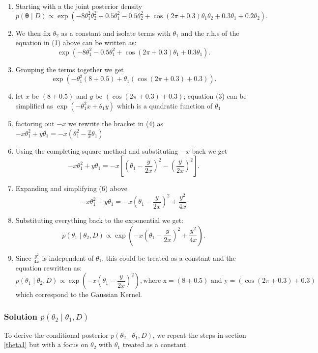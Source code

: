\documentclass[12pt]{article}
\begin{document}
\begin{enumerate}
    \item Starting with a the joint posterior density \[
p(\boldsymbol{\theta} \mid D) \propto \exp\left(-8\theta_1^2\theta_2^2 - 0.5\theta_1^2 - 0.5\theta_2^2 + \cos(2\pi + 0.3)\theta_1\theta_2 + 0.3\theta_1 + 0.2\theta_2 \right).\]
    \item  We then fix  $\theta_2$ as a constant and isolate terms with $\theta_1$ and the r.h.s of the equation in (1) above can be written as:
    \[\exp\left(-8\theta_1^2 - 0.5\theta_1^2+ \cos(2\pi + 0.3)\theta_1+ 0.3\theta_1 \right).\]
    \item Grouping the terms together we get
    \[\exp\left(-\theta_1^2\left(8 +0.5\right)+ \theta_1 \left(\cos(2\pi + 0.3)+ 0.3\right)\right).\]
    \item let $x$ be $\left(8 +0.5\right)$ and $y$ be $\left(\cos(2\pi + 0.3)+ 0.3\right)$; equation (3) can be simplified as $\exp\left(-\theta_1^2x+ \theta_1y\right)$ which is a quadratic function of $\theta_1$
    \item factoring out $-x$ we rewrite the bracket in (4) as $-x\theta_1^2 + y\theta_1 = -x\left(\theta_1^2 - \frac{y}{x}\theta_1\right)$
    \item Using the completing square method and substituting $-x$ back we get
    \[
-x\theta_1^2 + y\theta_1 = -x\left[\left(\theta_1 - \frac{y}{2x}\right)^2 - \left(\frac{y}{2x}\right)^2\right].
\]
 \item Expanding and simplifying (6) above
 \[
-x\theta_1^2 + y\theta_1 = -x\left(\theta_1 - \frac{y}{2x}\right)^2 + \frac{y^2}{4x}
\]
\item Substituting everything back to the exponential we get:
\[
p(\theta_1 \mid \theta_2, D) \propto \exp\left(-x\left(\theta_1 - \frac{y}{2x}\right)^2 + \frac{y^2}{4x}\right).
\]
\item Since \(\frac{y^2}{4x}\) is independent of \(\theta_1\), this could be treated as a constant and the equation rewritten as:
\[
p(\theta_1 \mid \theta_2, D) \propto \exp\left(-x\left(\theta_1 - \frac{y}{2x}\right)^2\right), \text {where x} =\left(8 +0.5\right) \text { and y} = \left(\cos(2\pi + 0.3)+ 0.3\right)\] which correspond to the Gaussian Kernel. 

\end{enumerate}

\subsubsection{Solution \(p(\theta_2 \mid \theta_1, D)\) }
To derive the conditional posterior \(p(\theta_2 \mid \theta_1, D)\), we repeat the steps in section \ref{theta1} but with a focus on $\theta_2$ with $\theta_1$ treated as a constant.
\end{document}
